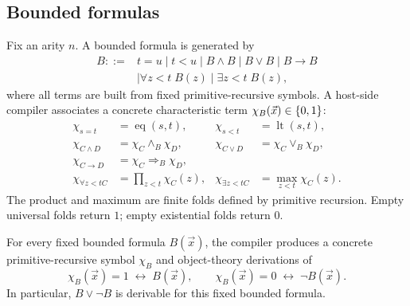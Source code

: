 \subsection{Bounded formulas}

Fix an arity \(n\).  A bounded formula is generated by
\[
\begin{split}
 B ::= {}& t=u \mid t<u \mid B\wedge B \mid B\vee B \mid B\to B\\
        &\mid \forall z<t\;B(z) \mid \exists z<t\;B(z),
\end{split}
\]
where all terms are built from fixed primitive-recursive symbols.  A host-side compiler associates a
concrete characteristic term \(\chi_B(\vec x)\in\{0,1\}\):
\begin{align*}
 \chi_{s=t} &= \operatorname{eq}(s,t), &
 \chi_{s<t} &= \operatorname{lt}(s,t),\\
 \chi_{C\wedge D} &= \chi_C\wedge_B\chi_D, &
 \chi_{C\vee D} &= \chi_C\vee_B\chi_D,\\
 \chi_{C\to D} &= \chi_C\Rightarrow_B\chi_D,\\
 \chi_{\forall z<t C} &= \prod_{z<t}\chi_C(z), &
 \chi_{\exists z<t C} &= \max_{z<t}\chi_C(z).
\end{align*}
The product and maximum are finite folds defined by primitive recursion.  Empty universal folds return
\(1\); empty existential folds return \(0\).

\begin{theorem}
\label{thm:booleanization}
For every fixed bounded formula \(B(\vec x)\), the compiler produces a concrete primitive-recursive symbol
\(\chi_B\) and object-theory derivations of
\[
 \chi_B(\vec x)=1\;\leftrightarrow\;B(\vec x),
 \qquad
 \chi_B(\vec x)=0\;\leftrightarrow\;\neg B(\vec x).
\]
In particular, \(B\vee\neg B\) is derivable for this fixed bounded formula.
\end{theorem}

